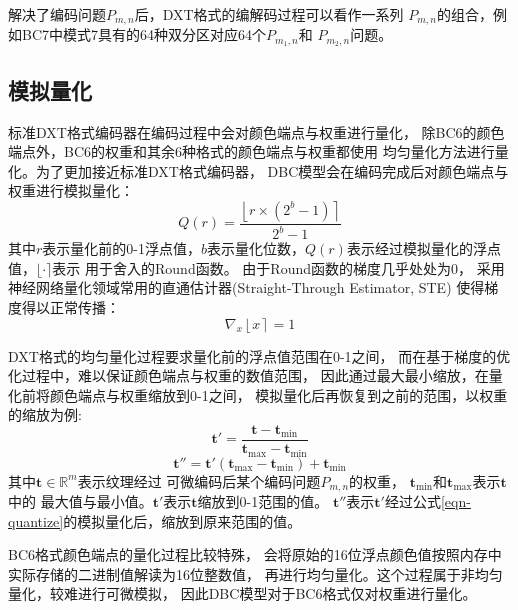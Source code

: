 解决了编码问题$P_{m,n}$后，DXT格式的编解码过程可以看作一系列
$P_{m,n}$的组合，例如BC7中模式7具有的64种双分区对应64个$P_{m_1,n}$和
$P_{m_2,n}$问题。

\subsection{模拟量化}
\label{模拟量化}

标准DXT格式编码器在编码过程中会对颜色端点与权重进行量化，
除BC6的颜色端点外，BC6的权重和其余6种格式的颜色端点与权重都使用
均匀量化方法进行量化。为了更加接近标准DXT格式编码器，
DBC模型会在编码完成后对颜色端点与权重进行模拟量化：
\begin{equation}\label{eqn-quantize}
    Q(r)=\frac{\left \lfloor r \times (2^{b}-1) \right \rceil}{2^{b}-1}
\end{equation}
其中$r$表示量化前的0-1浮点值，$b$表示量化位数，$Q(r)$表示经过模拟量化的浮点值，$\lfloor \cdot \rceil$表示
用于舍入的Round函数。
由于Round函数的梯度几乎处处为0，
采用神经网络量化领域常用的直通估计器\cite{bengio2013estimating}(Straight-Through Estimator, STE)
使得梯度得以正常传播：
\begin{equation}\label{eqn-7}
    \nabla_{x} \left \lfloor x \right \rceil=1
\end{equation}

DXT格式的均匀量化过程要求量化前的浮点值范围在0-1之间，
而在基于梯度的优化过程中，难以保证颜色端点与权重的数值范围，
因此通过最大最小缩放，在量化前将颜色端点与权重缩放到0-1之间，
模拟量化后再恢复到之前的范围，以权重的缩放为例:
\begin{equation}
    \mathbf{t'}=\frac{\mathbf{t}-\mathbf{t}_\text{min}}{\mathbf{t}_\text{max}-\mathbf{t}_\text{min}}
\end{equation}
\begin{equation}
    \mathbf{t''}=\mathbf{t'}(\mathbf{t}_\text{max}-\mathbf{t}_\text{min})+\mathbf{t}_\text{min}
\end{equation}
其中$\mathbf{t}\in\mathbb{R}^m$表示纹理经过
可微编码后某个编码问题$P_{m,n}$的权重，
$\mathbf{t}_\text{min}$和$\mathbf{t}_\text{max}$表示$\mathbf{t}$中的
最大值与最小值。$\mathbf{t'}$表示$\mathbf{t}$缩放到0-1范围的值。
$\mathbf{t''}$表示$\mathbf{t'}$经过公式\ref{eqn-quantize}的模拟量化后，缩放到原来范围的值。


BC6格式颜色端点的量化过程比较特殊，
会将原始的16位浮点颜色值按照内存中实际存储的二进制值解读为16位整数值，
再进行均匀量化。这个过程属于非均匀量化，较难进行可微模拟，
因此DBC模型对于BC6格式仅对权重进行量化。

